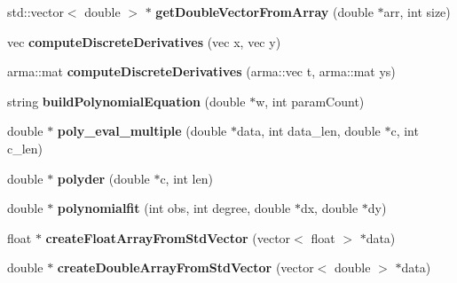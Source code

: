 \begin{DoxyCompactItemize}
\item 
std\+::vector$<$ double $>$ $\ast$ {\bfseries get\+Double\+Vector\+From\+Array} (double $\ast$arr, int size)\hypertarget{namespacekukadu_a6a8f99e06ddd1859374dddbb68f468b8}{}\label{namespacekukadu_a6a8f99e06ddd1859374dddbb68f468b8}

\item 
vec {\bfseries compute\+Discrete\+Derivatives} (vec x, vec y)\hypertarget{namespacekukadu_aa60d33e5c4264f143ed2d61d724e4da0}{}\label{namespacekukadu_aa60d33e5c4264f143ed2d61d724e4da0}

\item 
arma\+::mat {\bfseries compute\+Discrete\+Derivatives} (arma\+::vec t, arma\+::mat ys)\hypertarget{namespacekukadu_af6733c8ef38a9789684e159815f0fa0e}{}\label{namespacekukadu_af6733c8ef38a9789684e159815f0fa0e}

\item 
string {\bfseries build\+Polynomial\+Equation} (double $\ast$w, int param\+Count)\hypertarget{namespacekukadu_a8570101c8c4f0eb2512652952afd93c2}{}\label{namespacekukadu_a8570101c8c4f0eb2512652952afd93c2}

\item 
double $\ast$ {\bfseries poly\+\_\+eval\+\_\+multiple} (double $\ast$data, int data\+\_\+len, double $\ast$c, int c\+\_\+len)\hypertarget{namespacekukadu_aae0e37983e2b1493297e7a040daf9345}{}\label{namespacekukadu_aae0e37983e2b1493297e7a040daf9345}

\item 
double $\ast$ {\bfseries polyder} (double $\ast$c, int len)\hypertarget{namespacekukadu_acfe00d72c77824b38682dc8172405fc0}{}\label{namespacekukadu_acfe00d72c77824b38682dc8172405fc0}

\item 
double $\ast$ {\bfseries polynomialfit} (int obs, int degree, double $\ast$dx, double $\ast$dy)\hypertarget{namespacekukadu_ad112ecf6a165eb85f5573dfd8acb240e}{}\label{namespacekukadu_ad112ecf6a165eb85f5573dfd8acb240e}

\item 
float $\ast$ {\bfseries create\+Float\+Array\+From\+Std\+Vector} (vector$<$ float $>$ $\ast$data)\hypertarget{namespacekukadu_ae9d541d44f8331748da2e6a5df11b5ff}{}\label{namespacekukadu_ae9d541d44f8331748da2e6a5df11b5ff}

\item 
double $\ast$ {\bfseries create\+Double\+Array\+From\+Std\+Vector} (vector$<$ double $>$ $\ast$data)\hypertarget{namespacekukadu_ab44f7624668bea31213745273cea7536}{}\label{namespacekukadu_ab44f7624668bea31213745273cea7536}


\end{DoxyCompactItemize}
